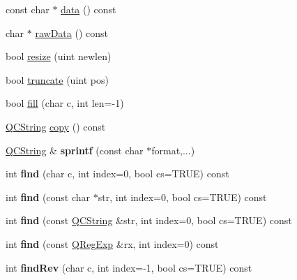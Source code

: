 \begin{DoxyCompactItemize}
\item 
const char $\ast$ \mbox{\hyperlink{class_q_c_string_a84a5aa4da9147a687fa291c844fb5fc1}{data}} () const
\item 
char $\ast$ \mbox{\hyperlink{class_q_c_string_aefbe03789d0fe05302adae84c54c3243}{raw\+Data}} () const
\item 
bool \mbox{\hyperlink{class_q_c_string_a8402bb62a3a1c6a79130c3b3cf38b52c}{resize}} (uint newlen)
\item 
bool \mbox{\hyperlink{class_q_c_string_a5644b56f807df5375dba545abca25f40}{truncate}} (uint pos)
\item 
bool \mbox{\hyperlink{class_q_c_string_a2061c09e8d70cd279d9cc9feef33d2bb}{fill}} (char c, int len=-\/1)
\item 
\mbox{\hyperlink{class_q_c_string}{Q\+C\+String}} \mbox{\hyperlink{class_q_c_string_a78c5504b7c222e907fa0cd6e13391b05}{copy}} () const
\item 
\mbox{\label{class_q_c_string_aa2dccf89cb25346c3ee81d75aa5859da}} 
\mbox{\hyperlink{class_q_c_string}{Q\+C\+String}} \& {\bfseries sprintf} (const char $\ast$format,...)
\item 
\mbox{\label{class_q_c_string_a0182ece6b76dad6475dafb53e2faaf10}} 
int {\bfseries find} (char c, int index=0, bool cs=T\+R\+UE) const
\item 
\mbox{\label{class_q_c_string_a5381d8547e101adef3ee87f8d54c9925}} 
int {\bfseries find} (const char $\ast$str, int index=0, bool cs=T\+R\+UE) const
\item 
\mbox{\label{class_q_c_string_a7227fa9c8db91de17b12305d5a6ca984}} 
int {\bfseries find} (const \mbox{\hyperlink{class_q_c_string}{Q\+C\+String}} \&str, int index=0, bool cs=T\+R\+UE) const
\item 
\mbox{\label{class_q_c_string_a35d94f04a36f5133d3fca3ff5a4f9f44}} 
int {\bfseries find} (const \mbox{\hyperlink{class_q_reg_exp}{Q\+Reg\+Exp}} \&rx, int index=0) const
\item 
\mbox{\label{class_q_c_string_ab47a6435c16d61d04fb448f1080b4e26}} 
int {\bfseries find\+Rev} (char c, int index=-\/1, bool cs=T\+R\+UE) const
\item 
\mbox{\label{class_q_c_string_ab6cbf7f8b8943606766d6e3d2e26fc70}} 

\end{DoxyCompactItemize}
